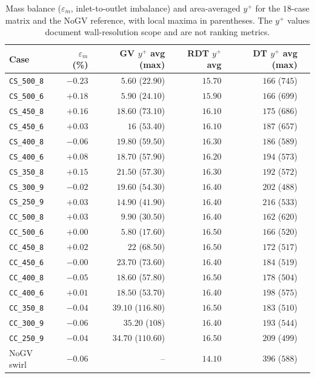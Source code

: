 \begin{table}[H]
\centering
\footnotesize
\caption[Mass balance and $y^+$ scope]{Mass balance ($\varepsilon_{\dot m}$, inlet-to-outlet imbalance) and area-averaged $y^+$ for the $18$-case matrix and the NoGV reference, with local maxima in parentheses. The $y^+$ values document wall-resolution scope and are not ranking metrics.}
\label{tab:mass-and-yplus}
\begin{tabular}{l r rr r r}
\hline
Case & $\varepsilon_{\dot m}$ (\%) & GV $y^+$ avg (max) & RDT $y^+$ avg & DT $y^+$ avg (max) \\ 
\hline
\texttt{CS\_500\_8} & $-0.23$ & $5.60$ ($22.90$)  & $15.70$ & $166$ ($745$) \\
\texttt{CS\_500\_6} & $+0.18$ & $5.90$ ($24.10$)  & $15.90$ & $166$ ($699$) \\
\texttt{CS\_450\_8} & $+0.16$ & $18.60$ ($73.10$) & $16.10$ & $175$ ($686$) \\
\texttt{CS\_450\_6} & $+0.03$ & $16$ ($53.40$) & $16.10$ & $187$ ($657$) \\
\texttt{CS\_400\_8} & $-0.06$ & $19.80$ ($59.50$) & $16.30$ & $186$ ($589$) \\
\texttt{CS\_400\_6} & $+0.08$ & $18.70$ ($57.90$) & $16.20$ & $194$ ($573$) \\
\texttt{CS\_350\_8} & $+0.15$ & $21.50$ ($57.30$) & $16.30$ & $192$ ($572$) \\
\texttt{CS\_300\_9} & $-0.02$ & $19.60$ ($54.30$) & $16.40$ & $202$ ($488$) \\
\texttt{CS\_250\_9} & $+0.03$ & $14.90$ ($41.90$) & $16.40$ & $216$ ($533$) \\
\texttt{CC\_500\_8} & $+0.03$ & $9.90$  ($30.50$) & $16.40$ & $162$ ($620$) \\
\texttt{CC\_500\_6} & $+0.00$ & $5.80$  ($17.60$) & $16.50$ & $166$ ($520$) \\
\texttt{CC\_450\_8} & $+0.02$ & $22$ ($68.50$) & $16.50$ & $172$ ($517$) \\
\texttt{CC\_450\_6} & $-0.00$ & $23.70$ ($73.60$) & $16.40$ & $184$ ($519$) \\
\texttt{CC\_400\_8} & $-0.05$ & $18.60$ ($57.80$) & $16.50$ & $178$ ($504$) \\
\texttt{CC\_400\_6} & $+0.01$ & $18.50$ ($53.70$) & $16.40$ & $198$ ($575$) \\
\texttt{CC\_350\_8} & $-0.04$ & $39.10$ ($116.80$) & $16.50$ & $183$ ($510$) \\
\texttt{CC\_300\_9} & $-0.06$ & $35.20$ ($108$) & $16.40$ & $193$ ($544$) \\
\texttt{CC\_250\_9} & $-0.04$ & $34.70$ ($110.60$) & $16.50$ & $209$ ($499$) \\
NoGV swirl          & $-0.06$ & --                  & $14.10$ & $396$ ($588$) \\
\hline
\end{tabular}
\end{table}

